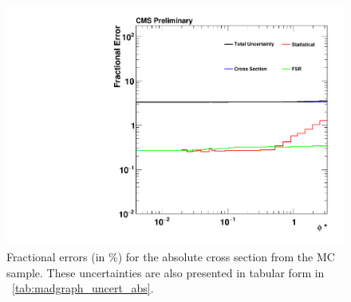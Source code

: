 \begin{figure}[!p]
    \centering
    \includegraphics[width=\textwidth]{figures/madgraph_uncertainty_absolute.pdf}
    \caption[
        Fractional errors (in \%) for the absolute cross section from the
        \MADGRAPH MC sample.
    ]{
        Fractional errors (in \%) for the absolute cross section from the
        \MADGRAPH MC sample. These uncertainties are also presented in tabular
        form in \TAB~\ref{tab:madgraph_uncert_abs}.
    }
    \label{fig:madgraph_uncert_abs}
\end{figure}
